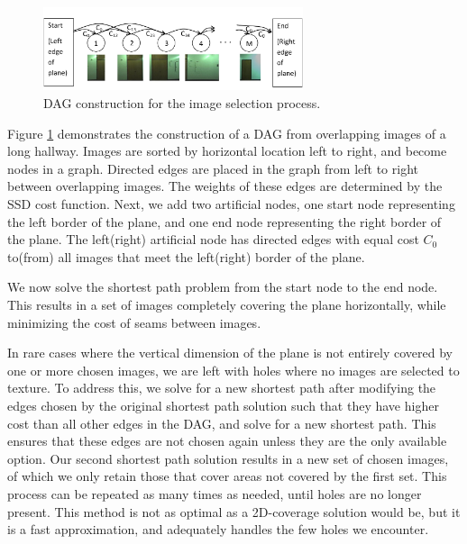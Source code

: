 \documentclass[10pt,twocolumn,letterpaper]{article}
\begin{document}
\begin{figure}
  \centering
  \includegraphics[width=3in]{dagCreation.pdf}
  \caption{DAG construction for the image selection process. \\}
  \label{fig:dagCreation}
\end{figure}

Figure \ref{fig:dagCreation} demonstrates the construction of a DAG
from overlapping images of a long hallway. Images are sorted by
horizontal location left to right, and become nodes in a
graph. Directed edges are placed in the graph from left to right
between overlapping images. The weights of these edges are determined
by the SSD cost function. Next, we add two artificial nodes, one start
node representing the left border of the plane, and one end node
representing the right border of the plane. The left(right) artificial
node has directed edges with equal cost $C_0$ to(from) all images that
meet the left(right) border of the plane.

We now solve the shortest path problem from the start node to the end
node. This results in a set of images completely covering the plane
horizontally, while minimizing the cost of seams between images.

In rare cases where the vertical dimension of the plane is not
entirely covered by one or more chosen images, we are left with holes
where no images are selected to texture. To address this, we solve for
a new shortest path after modifying the edges chosen by the original
shortest path solution such that they have higher cost than all other
edges in the DAG, and solve for a new shortest path. This ensures that
these edges are not chosen again unless they are the only available
option. Our second shortest path solution results in a new set of
chosen images, of which we only retain those that cover areas not
covered by the first set. This process can be repeated as many times
as needed, until holes are no longer present. This method is not as
optimal as a 2D-coverage solution would be, but it is a fast
approximation, and adequately handles the few holes we encounter.
\end{document}

